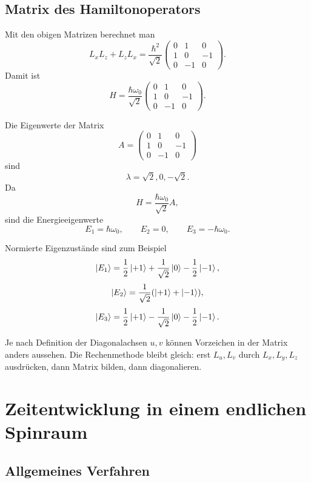 \subsection{Matrix des Hamiltonoperators}

Mit den obigen Matrizen berechnet man
\[
    L_xL_z+L_zL_x
    =\frac{\hbar^2}{\sqrt2}
    \begin{pmatrix}
        0&1&0\\
        1&0&-1\\
        0&-1&0
    \end{pmatrix}.
\]
Damit ist
\[
    H=\frac{\hbar\omega_0}{\sqrt2}
    \begin{pmatrix}
        0&1&0\\
        1&0&-1\\
        0&-1&0
    \end{pmatrix}.
\]

\begin{calculationbox}
Die Eigenwerte der Matrix
\[
    A=\begin{pmatrix}
        0&1&0\\
        1&0&-1\\
        0&-1&0
    \end{pmatrix}
\]
sind
\[
    \lambda=\sqrt2,0,-\sqrt2.
\]
Da
\[
    H=\frac{\hbar\omega_0}{\sqrt2}A,
\]
sind die Energieeigenwerte
\[
    E_1=\hbar\omega_0,
    \qquad
    E_2=0,
    \qquad
    E_3=-\hbar\omega_0.
\]
\end{calculationbox}

Normierte Eigenzustände sind zum Beispiel
\[
    \left|E_1\right\rangle=\frac12\left|+1\right\rangle+\frac{1}{\sqrt2}\left|0\right\rangle-\frac12\left|-1\right\rangle,
\]
\[
    \left|E_2\right\rangle=\frac{1}{\sqrt2}(\left|+1\right\rangle+\left|-1\right\rangle),
\]
\[
    \left|E_3\right\rangle=\frac12\left|+1\right\rangle-\frac{1}{\sqrt2}\left|0\right\rangle-\frac12\left|-1\right\rangle.
\]

\begin{notebox}
Je nach Definition der Diagonalachsen \(u,v\) können Vorzeichen in der Matrix anders aussehen. Die Rechenmethode bleibt gleich: erst \(L_u,L_v\) durch \(L_x,L_y,L_z\) ausdrücken, dann Matrix bilden, dann diagonalieren.
\end{notebox}

\section{Zeitentwicklung in einem endlichen Spinraum}

\subsection{Allgemeines Verfahren}

